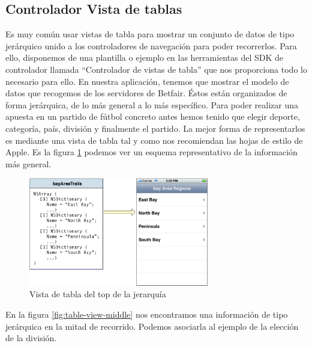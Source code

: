  \subsection{Controlador Vista de tablas}	

  Es muy común usar vistas de tabla para mostrar un conjunto de datos de tipo jerárquico unido a los controladores de navegación para poder recorrerlos.  %
  Para ello, disponemos %
   de una plantilla o ejemplo en las herramientas del SDK %
   de controlador llamada ``Controlador de vistas de tabla'' que nos proporciona todo lo necesario para ello. En nuestra aplicación, tenemos que mostrar el modelo de datos que recogemos de los servidores de Betfair. Éstos están organizados de forma jerárquica, de lo más general a lo más específico. Para poder realizar una apuesta en un partido de fútbol concreto antes hemos tenido que elegir deporte, categoría, país, división y finalmente el partido.
 La mejor forma de representarlos es mediante una vista de tabla tal y como nos recomiendan las hojas de estilo de Apple. Es la figura \ref{fig:table-view-top} podemos ver un esquema representativo de la información más general.

  
 \begin{figure}[h!]
  \centering
    \includegraphics[width=0.7\textwidth]{./images/tv_datamodel_top.jpg}
  \caption{Vista de tabla del top de la jerarquía }
  \label{fig:table-view-top}
\end{figure} 

 En la figura \ref{fig:table-view-middle} nos encontramos una información de tipo jerárquica en la mitad de recorrido. Podemos asociarla al ejemplo de la elección de la división.

